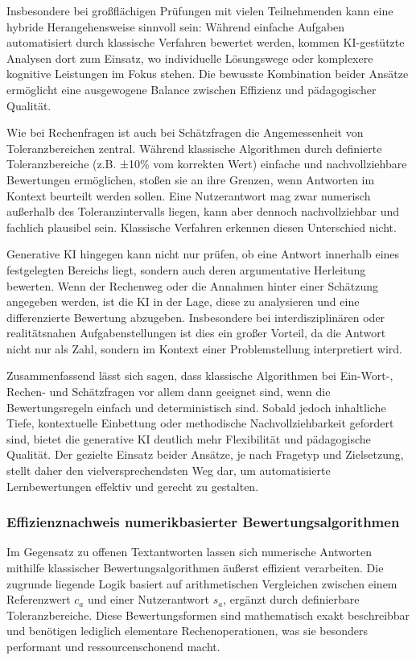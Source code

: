 \documentclass[a4paper,12pt]{article}
\begin{document}
Insbesondere bei großflächigen Prüfungen mit vielen Teilnehmenden kann eine hybride Herangehensweise sinnvoll sein: Während einfache Aufgaben automatisiert durch klassische Verfahren bewertet werden, kommen KI-gestützte Analysen dort zum Einsatz, wo individuelle Lösungswege oder komplexere kognitive Leistungen im Fokus stehen. Die bewusste Kombination beider Ansätze ermöglicht eine ausgewogene Balance zwischen Effizienz und pädagogischer Qualität.

Wie bei Rechenfragen ist auch bei Schätzfragen die Angemessenheit von Toleranzbereichen zentral. Während klassische Algorithmen durch definierte Toleranzbereiche (z.B. ±10\% vom korrekten Wert) einfache und nachvollziehbare Bewertungen ermöglichen, stoßen sie an ihre Grenzen, wenn Antworten im Kontext beurteilt werden sollen. Eine Nutzerantwort mag zwar numerisch außerhalb des Toleranzintervalls liegen, kann aber dennoch nachvollziehbar und fachlich plausibel sein. Klassische Verfahren erkennen diesen Unterschied nicht.

Generative KI hingegen kann nicht nur prüfen, ob eine Antwort innerhalb eines festgelegten Bereichs liegt, sondern auch deren argumentative Herleitung bewerten. Wenn der Rechenweg oder die Annahmen hinter einer Schätzung angegeben werden, ist die KI in der Lage, diese zu analysieren und eine differenzierte Bewertung abzugeben. Insbesondere bei interdisziplinären oder realitätsnahen Aufgabenstellungen ist dies ein großer Vorteil, da die Antwort nicht nur als Zahl, sondern im Kontext einer Problemstellung interpretiert wird.

Zusammenfassend lässt sich sagen, dass klassische Algorithmen bei Ein-Wort-, Rechen- und Schätzfragen vor allem dann geeignet sind, wenn die Bewertungsregeln einfach und deterministisch sind. Sobald jedoch inhaltliche Tiefe, kontextuelle Einbettung oder methodische Nachvollziehbarkeit gefordert sind, bietet die generative KI deutlich mehr Flexibilität und pädagogische Qualität. Der gezielte Einsatz beider Ansätze, je nach Fragetyp und Zielsetzung, stellt daher den vielversprechendsten Weg dar, um automatisierte Lernbewertungen effektiv und gerecht zu gestalten.

\subsubsection{Effizienznachweis numerikbasierter Bewertungsalgorithmen}

Im Gegensatz zu offenen Textantworten lassen sich numerische Antworten mithilfe klassischer Bewertungsalgorithmen äußerst effizient verarbeiten. Die zugrunde liegende Logik basiert auf arithmetischen Vergleichen zwischen einem Referenzwert \( c_a \) und einer Nutzerantwort \( s_a \), ergänzt durch definierbare Toleranzbereiche. Diese Bewertungsformen sind mathematisch exakt beschreibbar und benötigen lediglich elementare Rechenoperationen, was sie besonders performant und ressourcenschonend macht.
\end{document}
